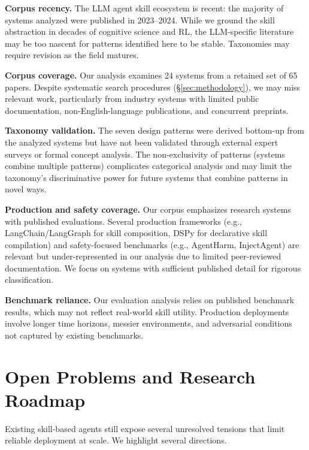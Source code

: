 \documentclass[conference, compsoc]{IEEEtran}
\theoremstyle{plain}
\newcommand{\para}[1]{\smallskip\noindent\textbf{#1.}}
\begin{document}
{\para{Corpus recency} The LLM agent skill ecosystem is recent: the majority of systems analyzed were published in 2023--2024. While we ground the skill abstraction in decades of cognitive science and RL, the LLM-specific literature may be too nascent for patterns identified here to be stable. Taxonomies may require revision as the field matures.

\para{Corpus coverage} Our analysis examines 24 systems from a retained set of 65 papers. Despite systematic search procedures (\S\ref{sec:methodology}), we may miss relevant work, particularly from industry systems with limited public documentation, non-English-language publications, and concurrent preprints.

\para{Taxonomy validation} The seven design patterns were derived bottom-up from the analyzed systems but have not been validated through external expert surveys or formal concept analysis. The non-exclusivity of patterns (systems combine multiple patterns) complicates categorical analysis and may limit the taxonomy's discriminative power for future systems that combine patterns in novel ways.

\para{Production and safety coverage} Our corpus emphasizes research systems with published evaluations. Several production frameworks (e.g., LangChain/LangGraph for skill composition, DSPy for declarative skill compilation) and safety-focused benchmarks (e.g., AgentHarm, InjectAgent) are relevant but under-represented in our analysis due to limited peer-reviewed documentation. We focus on systems with sufficient published detail for rigorous classification.

\para{Benchmark reliance} Our evaluation analysis relies on published benchmark results, which may not reflect real-world skill utility. Production deployments involve longer time horizons, messier environments, and adversarial conditions not captured by existing benchmarks.

\section{Open Problems and Research Roadmap}
\label{sec:openproblems}

Existing skill-based agents still expose several unresolved tensions that limit reliable deployment at scale. We highlight several directions.


}
\end{document}
